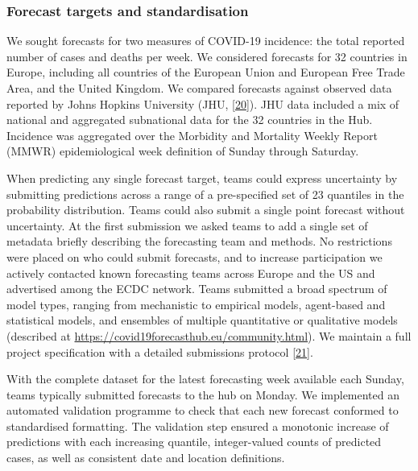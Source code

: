 \documentclass[
]{article}
\begin{document}
\hypertarget{forecast-targets-and-standardisation}{%
\subsubsection{Forecast targets and
standardisation}\label{forecast-targets-and-standardisation}}

We sought forecasts for two measures of COVID-19 incidence: the total
reported number of cases and deaths per week. We considered forecasts
for 32 countries in Europe, including all countries of the European
Union and European Free Trade Area, and the United Kingdom. We compared
forecasts against observed data reported by Johns Hopkins University
(JHU,
\protect\hyperlink{ref-dongInteractiveWebbasedDashboard2020}{{[}20{]}}).
JHU data included a mix of national and aggregated subnational data for
the 32 countries in the Hub. Incidence was aggregated over the Morbidity
and Mortality Weekly Report (MMWR) epidemiological week definition of
Sunday through Saturday.

When predicting any single forecast target, teams could express
uncertainty by submitting predictions across a range of a pre-specified
set of 23 quantiles in the probability distribution. Teams could also
submit a single point forecast without uncertainty. At the first
submission we asked teams to add a single set of metadata briefly
describing the forecasting team and methods. No restrictions were placed
on who could submit forecasts, and to increase participation we actively
contacted known forecasting teams across Europe and the US and
advertised among the ECDC network. Teams submitted a broad spectrum of
model types, ranging from mechanistic to empirical models, agent-based
and statistical models, and ensembles of multiple quantitative or
qualitative models (described at
\url{https://covid19forecasthub.eu/community.html}). We maintain a full
project specification with a detailed submissions protocol
\protect\hyperlink{ref-europeancovid-19forecasthubCovid19forecasthubeuropeWiki}{{[}21{]}}.

With the complete dataset for the latest forecasting week available each
Sunday, teams typically submitted forecasts to the hub on Monday. We
implemented an automated validation programme to check that each new
forecast conformed to standardised formatting. The validation step
ensured a monotonic increase of predictions with each increasing
quantile, integer-valued counts of predicted cases, as well as
consistent date and location definitions.
\end{document}
